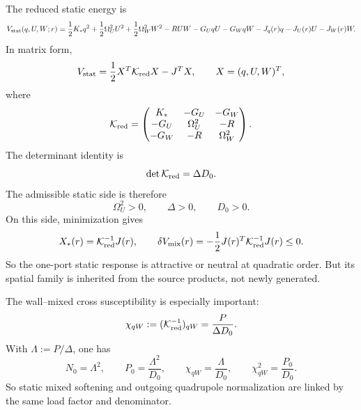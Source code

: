 The reduced static energy is
\begin{equation}
\label{eq:app-part07-static-energy}
V_{\rm stat}(q,U,W;r)
=
\frac12K_*q^2+\frac12\Omega_U^2U^2+\frac12\Omega_W^2W^2
-RUW-G_UqU-G_WqW-J_q(r)q-J_U(r)U-J_W(r)W.
\end{equation}
In matrix form,
\begin{equation}
\label{eq:app-part07-static-kred}
V_{\rm stat}=\frac12X^T\mathcal K_{\rm red}X-J^TX,
\qquad
X=(q,U,W)^T,
\end{equation}
where
\begin{equation}
\label{eq:app-part07-static-kred-matrix}
\mathcal K_{\rm red}
=
\begin{pmatrix}
K_* & -G_U & -G_W \\
-G_U & \Omega_U^2 & -R \\
-G_W & -R & \Omega_W^2
\end{pmatrix}.
\end{equation}
The determinant identity is
\begin{equation}
\label{eq:app-part07-static-det}
\det\mathcal K_{\rm red}=\Delta D_0.
\end{equation}
The admissible static side is therefore
\begin{equation}
\label{eq:app-part07-static-admissible}
\Omega_U^2>0,
\qquad
\Delta>0,
\qquad
D_0>0.
\end{equation}
On this side, minimization gives
\begin{equation}
\label{eq:app-part07-static-onshell}
X_*(r)=\mathcal K_{\rm red}^{-1}J(r),
\qquad
\delta V_{\rm mix}(r)=-\frac12J(r)^T\mathcal K_{\rm red}^{-1}J(r)\le0.
\end{equation}
So the one-port static response is attractive or neutral at quadratic order.  But its spatial family is inherited from the source products, not newly generated.

The wall--mixed cross susceptibility is especially important:
\begin{equation}
\label{eq:app-part07-static-chi-qw}
\chi_{qW}:=(\mathcal K_{\rm red}^{-1})_{qW}
=
\frac{P}{\Delta D_0}.
\end{equation}
With \(\Lambda:=P/\Delta\), one has
\begin{equation}
\label{eq:app-part07-static-load-identities}
N_0=\Lambda^2,
\qquad
P_0=\frac{\Lambda^2}{D_0},
\qquad
\chi_{qW}=\frac{\Lambda}{D_0},
\qquad
\chi_{qW}^2=\frac{P_0}{D_0}.
\end{equation}
So static mixed softening and outgoing quadrupole normalization are linked by the same load factor and denominator.

